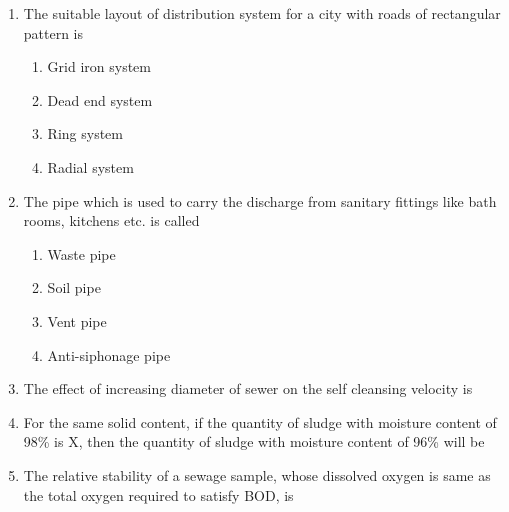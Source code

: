 \documentclass[11pt,a4paper]{article}
\begin{document}
\begin{enumerate}
\item{The suitable layout of distribution system for a city with roads of rectangular pattern is}
\begin{enumerate}[label=\Alph*.]
\item{Grid iron system}
\item{Dead end system}
\item{Ring system}
\item{Radial system}
\end{enumerate}
\item{The pipe which is used to carry the discharge from sanitary fittings like bath rooms, kitchens etc. is called}
\begin{enumerate}[label=\Alph*.]
\item{Waste pipe}
\item{Soil pipe}
\item{Vent pipe}
\item{Anti-siphonage pipe}
\end{enumerate}
\item{The effect of increasing diameter of sewer on the self cleansing velocity is}
\\
\item{For the same solid content, if the quantity of sludge with moisture content of 98\% is X, then the quantity of sludge with moisture content of 96\% will be}
\\
\item{The relative stability of a sewage sample, whose dissolved oxygen is same as the total oxygen required to satisfy BOD, is}

\end{enumerate}
\end{document}
